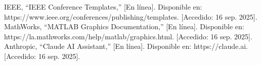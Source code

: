 \documentclass[journal]{IEEEtran} %
\begin{document}
\begin{thebibliography}{00}
     IEEE, ``IEEE Conference Templates,'' [En línea]. Disponible en: https://www.ieee.org/conferences/publishing/templates. [Accedido: 16 sep. 2025].
     MathWorks, ``MATLAB Graphics Documentation,'' [En línea]. Disponible en: https://la.mathworks.com/help/matlab/graphics.html. [Accedido: 16 sep. 2025].
     Anthropic, ``Claude AI Assistant,'' [En línea]. Disponible en: https://claude.ai. [Accedido: 16 sep. 2025].
\end{thebibliography}
\vspace{12pt}
\end{document}
